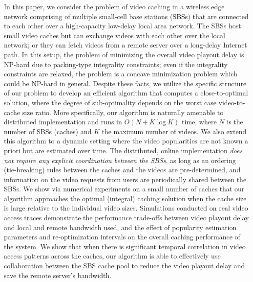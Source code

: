\documentclass[conference]{IEEEtran}
\begin{document}
In this paper, we consider the problem of video caching in a wireless edge network comprising of multiple small-cell base stations (SBSs) that are connected to each other over a high-capacity low-delay local area network. The SBSs host small video caches but can exchange videos with each other over the local network; or they can fetch videos from a remote server over a long-delay Internet path. In this setup, the problem of minimizing the overall video playout delay is NP-hard due to packing-type integrality constraints; even if the integrality constraints are relaxed, the problem is a concave minimization problem which could be NP-hard in general. Despite these facts, we utilize the specific structure of our problem to develop an efficient algorithm that computes a close-to-optimal solution, where the degree of sub-optimality depends on the worst case video-to-cache size ratio. More specifically, our algorithm is naturally amenable to distributed implementation and runs in $O(N + K \log K)$ time, where $N$ is the number of SBSs (caches) and $K$ the maximum number of videos. 
We also extend this algorithm to a dynamic setting where the video popularities are not known a priori but are estimated over time. The distributed, online implementation \textit{does not require any explicit coordination between the SBSs}, as long as an ordering (tie-breaking) rules between the caches and the videos are pre-determined, and information on the video requests from users are periodically shared between the SBSs.
We show via numerical experiments on a small number of caches that our algorithm approaches the optimal (integral) caching solution when the cache size is large relative to the individual video sizes. Simulations conducted on real video access traces demonstrate the performance trade-offs between video playout delay and local and remote bandwidth used, and the effect of popularity estimation parameters and re-optimization intervals on the overall caching performance of the system. We show that when there is significant temporal correlation in video access patterns across the caches, our algorithm is able to effectively use collaboration between the SBS cache pool to reduce the video playout delay and save the remote server's bandwidth. 

\end{document}
